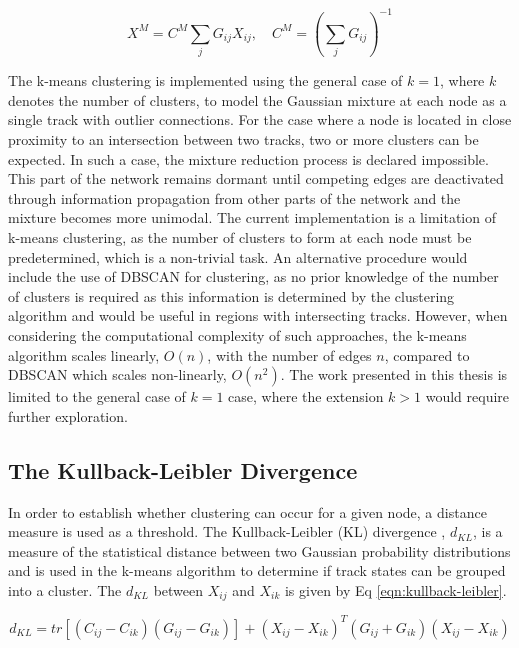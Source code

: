\begin{equation}
    X^{M} = C^{M} \sum_{j} G_{ij} X_{ij},  \quad  C^{M} = \left( \sum_{j} G_{ij} \right) ^{-1}
    \label{eqn:inverse-variance-weighting}
\end{equation}

The k-means clustering is implemented using the general case of $k=1$, where $k$ denotes the number of clusters, to model the Gaussian mixture at each node as a single track with outlier connections. For the case where a node is located in close proximity to an intersection between two tracks, two or more clusters can be expected. In such a case, the mixture reduction process is declared impossible. This part of the network remains dormant until competing edges are deactivated through information propagation from other parts of the network and the mixture becomes more unimodal. The current implementation is a limitation of k-means clustering, as the number of clusters to form at each node must be predetermined, which is a non-trivial task. An alternative procedure would include the use of DBSCAN for clustering, as no prior knowledge of the number of clusters is required as this information is determined by the clustering algorithm and would be useful in regions with intersecting tracks. However, when considering the computational complexity of such approaches, the k-means algorithm scales linearly, $O(n)$, with the number of edges $n$, compared to DBSCAN which scales non-linearly, $O(n^2)$. The work presented in this thesis is limited to the general case of $k=1$ case, where the extension $k > 1$ would require further exploration. 


\subsection{The Kullback-Leibler Divergence}
In order to establish whether clustering can occur for a given node, a distance measure is used as a threshold. The Kullback-Leibler (KL) divergence \cite{KL, FRUHWIRTH19971}, $d_{KL}$, is a measure of the statistical distance between two Gaussian probability distributions and is used in the k-means algorithm to determine if track states can be grouped into a cluster. The $d_{KL}$ between $X_{ij}$ and $X_{ik}$ is given by Eq \eqref{eqn:kullback-leibler}.

\begin{equation}
    d_{KL} = tr[(C_{ij} - C_{ik})(G_{ij} - G_{ik})] + (X_{ij} - X_{ik})^{T}(G_{ij} + G_{ik})(X_{ij} - X_{ik})
    \label{eqn:kullback-leibler}
\end{equation}

